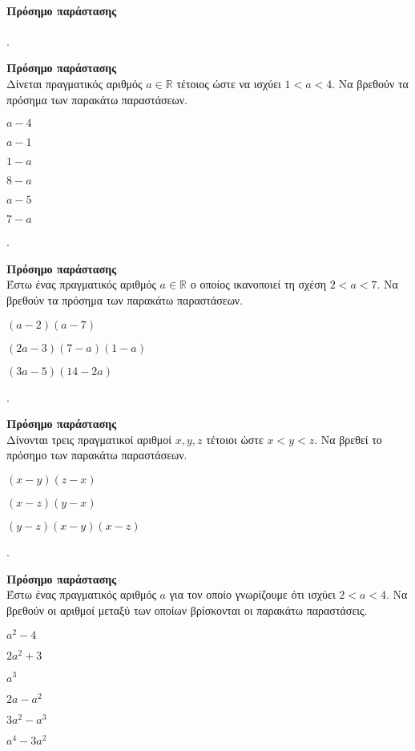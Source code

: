 \documentclass[11pt,a4paper,twocolumn]{article}
\newcounter{askhsh}
\newcommand{\askhsh}{\large\theaskhsh.\ \addtocounter{askhsh}{1}}
\begin{document}
\paragraph{Πρόσημο παράστασης}
\askhsh \textbf{Πρόσημο παράστασης}\\
Δίνεται πραγματικός αριθμός $ a\in\mathbb{R} $ τέτοιος ώστε να ισχύει $ 1<a<4 $. Να βρεθούν τα πρόσημα των παρακάτω παραστάσεων.
\begin{multicols}{3}
\begin{rlist}
\item $ a-4 $
\item $ a-1 $
\item $ 1-a $
\item $ 8-a $
\item $ a-5 $
\item $ 7-a $
\end{rlist}
\end{multicols}
\askhsh \textbf{Πρόσημο παράστασης}\\
Έστω ένας πραγματικός αριθμός $ a\in\mathbb{R} $ ο οποίος ικανοποιεί τη σχέση $ 2<a<7 $. Να βρεθούν τα πρόσημα των παρακάτω παραστάσεων.
\begin{rlist}
\item $ (a-2)(a-7) $
\item $ (2a-3)(7-a)(1-a) $
\item $ (3a-5)(14-2a) $
\end{rlist}
\askhsh \textbf{Πρόσημο παράστασης}\\
Δίνονται τρεις πραγματικοί αριθμοί $ x,y,z $ τέτοιοι ώστε $ x<y<z $. Να βρεθεί το πρόσημο των παρακάτω παραστάσεων.
\begin{rlist}
\item $ (x-y)(z-x) $
\item $ (x-z)(y-x) $
\item $ (y-z)(x-y)(x-z) $
\end{rlist}
\askhsh \textbf{Πρόσημο παράστασης}\\
Έστω ένας πραγματικός αριθμός $ a $ για τον οποίο γνωρίζουμε ότι ισχύει $ 2<a<4 $. Να βρεθούν οι αριθμοί μεταξύ των οποίων βρίσκονται οι παρακάτω παραστάσεις.
\begin{multicols}{3}
\begin{rlist}
\item $ a^2-4 $
\item $ 2a^2+3 $
\item $ a^3 $
\item $ 2a-a^2 $
\item $ 3a^2-a^3 $
\item $ a^4-3a^2 $
\end{rlist}
\end{multicols}
\end{document}
